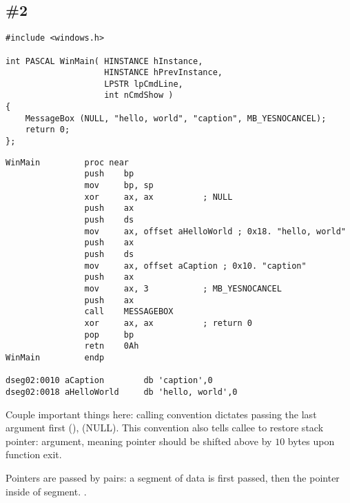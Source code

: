 \subsection{\Example{} \#2}
\label{win16_messagebox}

\begin{lstlisting}
#include <windows.h>

int PASCAL WinMain( HINSTANCE hInstance,
                    HINSTANCE hPrevInstance,
                    LPSTR lpCmdLine,
                    int nCmdShow )
{
	MessageBox (NULL, "hello, world", "caption", MB_YESNOCANCEL);
	return 0;
};
\end{lstlisting}

\begin{lstlisting}
WinMain         proc near
                push    bp
                mov     bp, sp
                xor     ax, ax          ; NULL
                push    ax
                push    ds
                mov     ax, offset aHelloWorld ; 0x18. "hello, world"
                push    ax
                push    ds
                mov     ax, offset aCaption ; 0x10. "caption"
                push    ax
                mov     ax, 3           ; MB_YESNOCANCEL
                push    ax
                call    MESSAGEBOX
                xor     ax, ax          ; return 0
                pop     bp
                retn    0Ah
WinMain         endp

dseg02:0010 aCaption        db 'caption',0
dseg02:0018 aHelloWorld     db 'hello, world',0
\end{lstlisting}

{Couple important things here:  calling convention dictates passing the last argument first} 
(),  (NULL).
{This convention also tells \gls{callee} to restore} \gls{stack pointer}:
    
{argument, meaning pointer should be shifted above by $10$ bytes upon function exit}.

{Pointers are passed by pairs: a segment of data is first passed, then the pointer inside of segment}.
.

